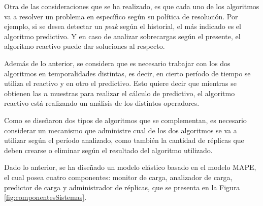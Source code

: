 
\normalsize{Otra de las consideraciones que se ha realizado, es que cada uno de los algoritmos va a resolver un problema en específico según su política de resolución. Por ejemplo, si se desea detectar un \textit{peak} según el historial, el más indicado es el algoritmo predictivo. Y en caso de analizar sobrecargas según el presente, el algoritmo reactivo puede dar soluciones al respecto.}

Además de lo anterior, se considera que es necesario trabajar con los dos algoritmos en temporalidades distintas, es decir, en cierto período de tiempo se utiliza el reactivo y en otro el predictivo. Esto quiere decir que mientras se obtienen las $n$ muestras para realizar el cálculo de predictivo, el algoritmo reactivo está realizando un análisis de los distintos operadores.


Como se diseñaron dos tipos de algoritmos que se complementan, es necesario considerar un mecanismo que administre cual de los dos algoritmos se va a utilizar según el período analizado, como también la cantidad de réplicas que deben crearse o eliminar según el resultado del algoritmo utilizado.

Dado lo anterior, se ha diseñado un modelo elástico \normalsize{basado en el modelo MAPE}\citep{jacob2004practical}\normalsize{, el cual posea cuatro componentes}: monitor de carga, analizador de carga, predictor de carga y administrador de réplicas, que se presenta en la Figura \ref{fig:componentesSistemas}.

